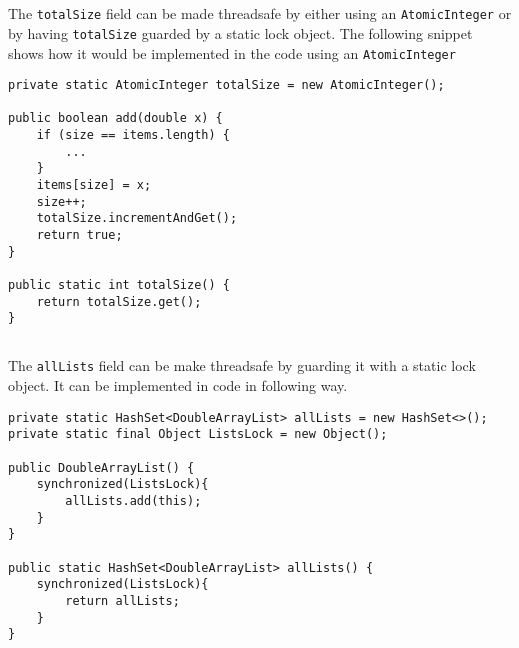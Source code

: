 \documentclass{ituhandin}
\begin{document}
\chapter{} %
\section{}
The \texttt{totalSize} field can be made threadsafe by either using an \texttt{AtomicInteger} or by having \texttt{totalSize} guarded by a static lock object. The following snippet shows how it would be implemented in the code using an \texttt{AtomicInteger}

\begin{lstlisting}[caption=Making totalSize threadsafe using an \texttt{AtomicInteger}]
private static AtomicInteger totalSize = new AtomicInteger();

public boolean add(double x) {
    if (size == items.length) {
        ...
    }
    items[size] = x;
    size++;
    totalSize.incrementAndGet();
    return true;
}

public static int totalSize() {
    return totalSize.get();
}
\end{lstlisting}

\section{}
The \texttt{allLists} field can be make threadsafe by guarding it with a static lock object. It can be implemented in code in following way.
\begin{lstlisting}[caption=Making \texttt{allLists} threadsafe by guarding it with a static lock]
private static HashSet<DoubleArrayList> allLists = new HashSet<>();
private static final Object ListsLock = new Object();

public DoubleArrayList() {
    synchronized(ListsLock){
        allLists.add(this);
    }
}

public static HashSet<DoubleArrayList> allLists() {
    synchronized(ListsLock){
        return allLists;
    }
}
\end{lstlisting}

\chapter{} %
\end{document}
